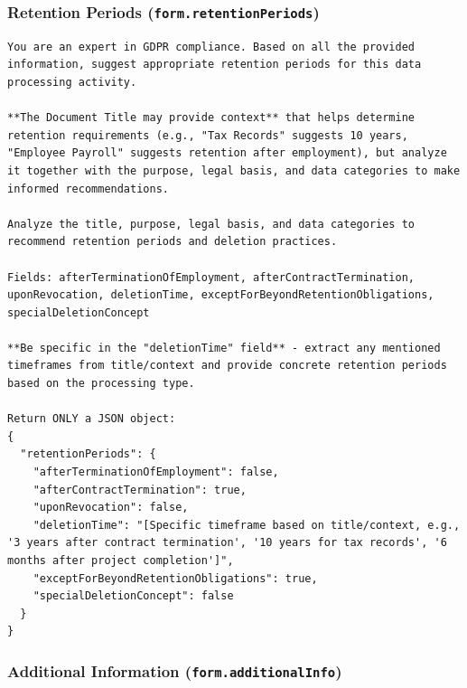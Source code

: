 \subsubsection*{Retention Periods (\texttt{form.retentionPeriods})}

\begin{lstlisting}
You are an expert in GDPR compliance. Based on all the provided information, suggest appropriate retention periods for this data processing activity.

**The Document Title may provide context** that helps determine retention requirements (e.g., "Tax Records" suggests 10 years, "Employee Payroll" suggests retention after employment), but analyze it together with the purpose, legal basis, and data categories to make informed recommendations.

Analyze the title, purpose, legal basis, and data categories to recommend retention periods and deletion practices.

Fields: afterTerminationOfEmployment, afterContractTermination, uponRevocation, deletionTime, exceptForBeyondRetentionObligations, specialDeletionConcept

**Be specific in the "deletionTime" field** - extract any mentioned timeframes from title/context and provide concrete retention periods based on the processing type.

Return ONLY a JSON object:
{
  "retentionPeriods": {
    "afterTerminationOfEmployment": false,
    "afterContractTermination": true,
    "uponRevocation": false,
    "deletionTime": "[Specific timeframe based on title/context, e.g., '3 years after contract termination', '10 years for tax records', '6 months after project completion']",
    "exceptForBeyondRetentionObligations": true,
    "specialDeletionConcept": false
  }
}
\end{lstlisting}

\subsubsection*{Additional Information (\texttt{form.additionalInfo})}

